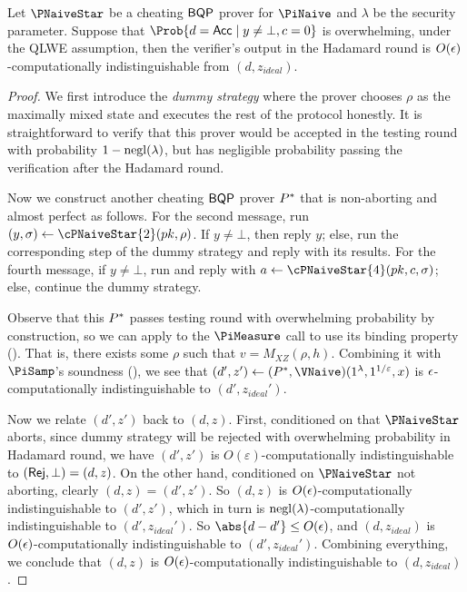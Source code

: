 \begin{theorem}
	\label{lem:naive-qpip0-binding}
	Let $\PNaiveStar$ be a cheating $\operatorname{\mathsf{BQP}}$ prover for $\PiNaive$ and $\lambda$ be the security parameter.
	Suppose that $\Prob{d=\Acc\mid y\ne\bot, c=0}$ is overwhelming, 
	under the QLWE assumption, then the verifier's output in the Hadamard round is $O(\epsilon)$-computationally indistinguishable from $(d, z_{ideal})$.
\end{theorem}
\begin{proof}
	We first introduce the \emph{dummy strategy} where the prover chooses $\rho$ as the maximally mixed state and executes the rest of the protocol honestly.
	It is straightforward to verify that this prover would be accepted in the testing round with probability $1-\operatorname{negl}(\lambda)$,
	but has negligible probability passing the verification after the Hadamard round.

	Now we construct another cheating $\operatorname{\mathsf{BQP}}$ prover $P^*$ that is non-aborting and almost perfect as follows.
	For the second message, run $(y, \sigma)\leftarrow\cPNaiveStar{2}(pk, \rho)$.
	If $y\ne\bot$, then reply $y$;
	else, run the corresponding step of the dummy strategy and reply with its results.
	For the fourth message, if $y\ne\bot$, run and reply with $a\leftarrow\cPNaiveStar{4}(pk, c, \sigma)$;
	else, continue the dummy strategy.

	Observe that this $P^*$ passes testing round with overwhelming probability by construction,
	so we can apply  to the $\PiMeasure$ call to use its binding property ().
	That is, there exists some $\rho$ such that $v=M_{XZ}(\rho, h)$.
	Combining it with $\PiSamp$'s soundness (),
	we see that $(d', z')\leftarrow(\Pstar, \VNaive)(1^\lambda, 1^{1/\varepsilon}, x)$ is $\epsilon$-computationally indistinguishable to $(d', z_{ideal}')$.

	Now we relate $(d', z')$ back to $(d, z)$.
	First, conditioned on that $\PNaiveStar$ aborts, since dummy strategy will be rejected with overwhelming probability in Hadamard round,
	we have $(d', z')$ is $O(\varepsilon)$-computationally indistinguishable to $(\mathsf{Rej}, \bot)=(d, z)$.
	On the other hand, conditioned on $\PNaiveStar$ not aborting, clearly $(d, z)=(d', z')$.
	So $(d, z)$ is $O(\epsilon)$-computationally indistinguishable to $(d', z')$,
	which in turn is $\operatorname{negl}(\lambda)$-computationally indistinguishable to $(d', z_{ideal}')$.
	So $\abs{d-d'}\leq O(\eps)$,
	and $(d, z_{ideal})$ is $O(\epsilon)$-computationally indistinguishable to $(d', z_{ideal}')$.
	Combining everything, we conclude that $(d, z)$ is $O(\epsilon)$-computationally indistinguishable to $(d, z_{ideal})$.
\end{proof}

